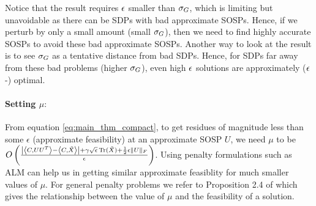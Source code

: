 Notice that the result requires $\epsilon$ smaller than $\sigma_G$, which is limiting but unavoidable as there can be SDPs with bad approximate SOSPs. Hence, if we perturb by only a small amount (small $\sigma_G$), then we need to find highly accurate SOSPs to avoid these bad approximate SOSPs. Another way to look at the result is to see $\sigma_G$ as a tentative distance from bad SDPs. Hence, for SDPs far away from these bad problems (higher $\sigma_G$), even high $\epsilon$ solutions are approximately ($\epsilon$-) optimal.

\paragraph{Setting $\mu:$}  From equation \eqref{eq:main_thm_compact}, to get residues of magnitude less than some $\epsilon$ (approximate feasibility) at an approximate SOSP $U$, we need $\mu$ to be $O \left(\frac{\left|\left\langle C, UU^T \right\rangle - \left\langle C, \tilde{X} \right\rangle\right| +\gamma \sqrt{\epsilon} \operatorname{Tr}(\tilde X) + \frac{1}{2}\epsilon \|U\|_F}{\epsilon} \right)$. Using penalty formulations such as ALM can help us in getting similar approximate feasiblity for much smaller values of $\mu$. For general penalty problems we refer to Proposition 2.4 of \citep{bertsekas2014constrained} which gives the relationship between the value of $\mu$ and the feasibility of a solution. 
